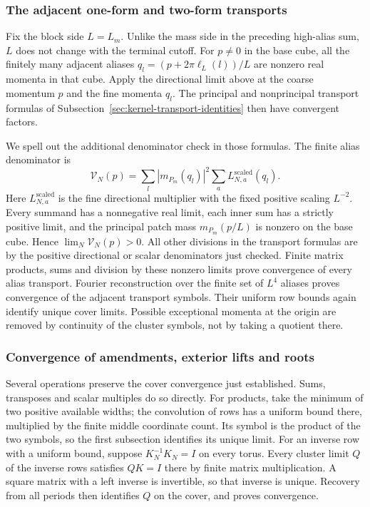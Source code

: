 \subsubsection{The adjacent one-form and two-form transports}
Fix the block side $L=L_m$. Unlike the mass side in the preceding
high-alias sum, $L$ does not change with the terminal cutoff.
For $p\ne0$ in the base cube, all the finitely many adjacent aliases
$q_l=(p+2\pi\ell_L(l))/L$ are nonzero real momenta in that cube.
Apply the directional limit above at the coarse momentum $p$ and
the fine momenta $q_l$. The principal and nonprincipal transport
formulas of Subsection~\ref{sec:kernel-transport-identities} then have
convergent factors.

We spell out the additional denominator check in those formulas.
The finite alias denominator is
\[
 \mathcal V_N(p)=\sum_l |m_{P_m}(q_l)|^2
                          \sum_a L_{N,a}^{\mathrm{scaled}}(q_l).
\]
Here $L_{N,a}^{\mathrm{scaled}}$ is the fine directional multiplier
with the fixed positive scaling $L^{-2}$. Every summand has a
nonnegative real limit, each inner sum has a strictly positive
limit, and the principal patch mass $m_{P_m}(p/L)$ is nonzero on
the base cube. Hence $\lim_N\mathcal V_N(p)>0$.
All other divisions in the transport formulas are by the positive
directional or scalar denominators just checked. Finite matrix
products, sums and division by these nonzero limits prove convergence
of every alias transport. Fourier reconstruction over the finite
set of $L^4$ aliases proves convergence of the adjacent transport
symbols. Their uniform row bounds again identify unique cover
limits. Possible exceptional momenta at the origin are removed by
continuity of the cluster symbols, not by taking a quotient there.

\subsubsection{Convergence of amendments, exterior lifts and roots}
Several operations preserve the cover convergence just established.
Sums, transposes and scalar multiples do so directly. For products,
take the minimum of two positive available widths; the convolution
of rows has a uniform bound there, multiplied by the finite middle
coordinate count. Its symbol is the product of the two symbols,
so the first subsection identifies its unique limit. For an inverse
row with a uniform bound, suppose $K_N^{-1}K_N=I$ on every torus.
Every cluster limit $Q$ of the inverse rows satisfies $QK=I$ there
by finite matrix multiplication. A square matrix with a left inverse
is invertible, so that inverse is unique. Recovery from all periods
then identifies $Q$ on the cover, and proves convergence.

